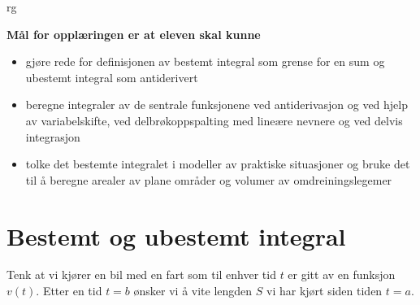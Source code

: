 



	
{rg}
\eqlen	

\vspace{\parskip}

\textbf{Mål for opplæringen er at eleven skal kunne}
\begin{itemize}
	\item gjøre rede for definisjonen av bestemt integral som grense for en sum og ubestemt integral som antiderivert
	\item beregne integraler av de sentrale funksjonene ved antiderivasjon og ved hjelp av variabelskifte, ved delbrøkoppspalting med lineære nevnere og ved delvis integrasjon
	\item tolke det bestemte integralet i modeller av praktiske situasjoner og bruke det til å beregne arealer av plane områder og volumer av omdreiningslegemer
\end{itemize}
\newpage

\section{Bestemt og ubestemt integral}
Tenk at vi kjører en bil med en fart som til enhver tid $ t $ er gitt av en funksjon $ v(t) $. Etter en tid $ {t=b }$ ønsker vi å vite lengden $ S $ vi har kjørt siden tiden $ t=a $.\vsk


